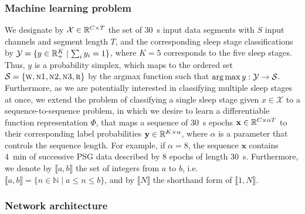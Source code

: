 \subsubsection{Machine learning problem}
We designate by $\mathcal{X} \in \mathbb{R}^{C \times T}$ the set of \SI{30}{\second} input data segments with $S$ input channels and segment length $T$, and the corresponding sleep stage classifications by $\mathcal{Y} = \lbrace y \in \mathbb{R}^{K}_{+} \mid \sum_i y_i = 1 \rbrace$, where $K = 5$ corresponds to the five sleep stages.
Thus, $y$ is a probability simplex, which maps to the ordered set $\mathcal{S} = \lbrace \textsc{w}, \textsc{n1}, \textsc{n2}, \textsc{n3}, \textsc{r} \rbrace$ by the argmax function such that $\operatorname*{arg\,max}{y : \mathcal{Y} \to \mathcal{S}}$.
Furthermore, as we are potentially interested in classifying multiple sleep stages at once, we extend the problem of classifying a single sleep stage given $x \in \mathcal{X}$ to a sequence-to-sequence problem, in which we desire to learn a differentiable function representation $\Phi$, that maps a sequence of \SI{30}{\second} epochs $\mathbf{x} \in \mathbb{R}^{C \times \alpha T}$ to their corresponding label probabilities $\mathbf{y} \in \mathbb{R}^{K \times \alpha}$, where $\alpha$ is a parameter that controls the sequence length. 
For example, if $\alpha=8$, the sequence $\mathbf{x}$ contains \SI{4}{\minute} of successive \ac{PSG} data described by 8 epochs of length \SI{30}{\second}.
Furthermore, we denote by $\llbracket a, b \rrbracket$ the set of integers from $a$ to $b$, i.e. $\llbracket a, b \rrbracket = \lbrace n \in \mathbb{N} \mid a \leq n \leq b \rbrace$, and by $\llbracket N \rrbracket$ the shorthand form of $\llbracket 1, N \rrbracket$.

\subsubsection{Network architecture}

